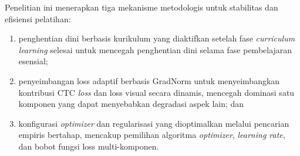 \begin{enumerate}[label=Fase \arabic*, wide=0pt, itemsep=1em, resume]
    Penelitian ini menerapkan tiga mekanisme metodologis untuk stabilitas dan efisiensi pelatihan:
    \begin{enumerate}[label=(\arabic*), leftmargin=*, nosep]
        \item penghentian dini berbasis kurikulum yang diaktifkan setelah fase \textit{curriculum learning} selesai untuk mencegah penghentian dini selama fase pembelajaran esensial;
        \item penyeimbangan loss adaptif berbasis GradNorm untuk menyeimbangkan kontribusi CTC \textit{loss} dan loss visual secara dinamis, mencegah dominasi satu komponen yang dapat menyebabkan degradasi aspek lain; dan
        \item konfigurasi \textit{optimizer} dan regularisasi yang dioptimalkan melalui pencarian empiris bertahap, mencakup pemilihan algoritma \textit{optimizer}, \textit{learning rate}, dan bobot fungsi loss multi-komponen.
    \end{enumerate}
\end{enumerate}

